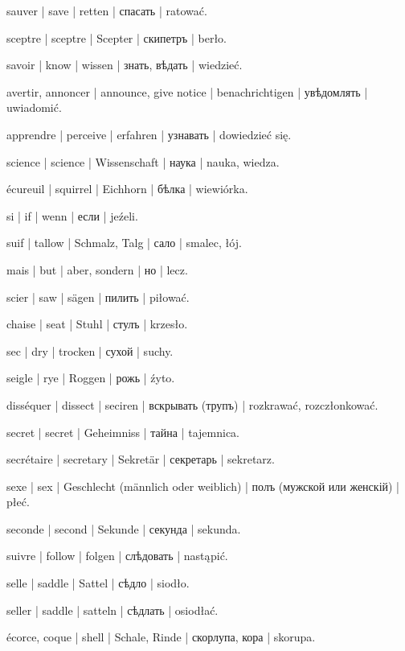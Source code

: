 \begin{outdent}{1em}
sauver | save | retten | спасать | ratować.

sceptre | sceptre | Scepter | скипетръ | berło.

savoir | know | wissen | знать, вѣдать | wiedzieć.

\uvsubentry{}
avertir, annoncer | announce, give notice | benachrichtigen | увѣдомлять | uwiadomić.


\uvsubentry{}
apprendre | perceive | erfahren | узнавать | dowiedzieć się.

science | science | Wissenschaft | наука | nauka, wiedza.

écureuil | squirrel | Eichhorn | бѣлка | wiewiórka.

si | if | wenn | если | jeźeli.

suif | tallow | Schmalz, Talg | сало | smalec, łój.

mais | but | aber, sondern | но | lecz.

scier | saw | sägen | пилить | piłować.

chaise | seat | Stuhl | стулъ | krzesło.

sec | dry | trocken | сухой | suchy.

seigle | rye | Roggen | рожь | źyto.

disséquer | dissect | seciren | вскрывать (трупъ) | rozkrawać,
rozczłonkować.

secret | secret | Geheimniss | тайна | tajemnica.

secrétaire | secretary | Sekretär | секретарь | sekretarz.

sexe | sex | Geschlecht (männlich oder weiblich) | полъ
(мужской или женскій) | płeć.

seconde | second | Sekunde | секунда | sekunda.

suivre | follow | folgen | слѣдовать | nastąpić.

selle | saddle | Sattel | сѣдло | siodło.

\uvsubentry{}
seller | saddle | satteln | сѣдлать | osiodłać.

écorce, coque | shell | Schale, Rinde | скорлупа, кора | skorupa.


\end{outdent}
